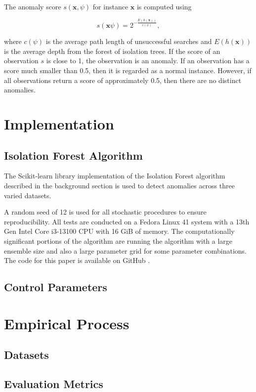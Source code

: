 \documentclass[10pt, conference]{IEEEtran}
\begin{document}
The anomaly score $s(\boldsymbol{x}, \psi)$ for instance $\boldsymbol{x}$ is computed using

\begin{equation}
	s(\boldsymbol{x} \psi) = 2^{- \frac{E(h(\boldsymbol{x}))}{c(\psi)}},
\end{equation}

where $c(\psi)$ is the average path length of unsuccessful searches and $E(h(\boldsymbol{x}))$ is the average depth from the forest of isolation trees. If the score of an observation $s$ is close to 1, the observation is an anomaly. If an observation has a score much smaller than 0.5, then it is regarded as a normal instance. However, if all observations return a score of approximately 0.5, then there are no distinct anomalies.


\section{Implementation}
\subsection{Isolation Forest Algorithm}
The Scikit-learn library \cite{scikit-learn} implementation of the Isolation Forest algorithm described in the background section is used to detect anomalies across three varied datasets. 

A random seed of 12 is used for all stochastic procedures to ensure reproducibility. All tests are conducted on a Fedora Linux 41 system with a 13th Gen Intel Core i3-13100 CPU with 16 GiB of memory. The computationally significant portions of the algorithm are running the algorithm with a large ensemble size and also a large parameter grid for some parameter combinations. The code for this paper is available on GitHub \cite{github}.

\subsection{Control Parameters}
\section{Empirical Process}
\subsection{Datasets}
\subsection{Evaluation Metrics}
\end{document}
